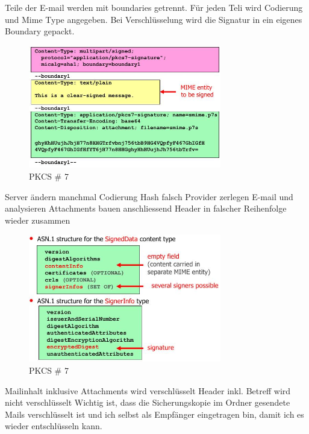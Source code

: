 \documentclass[ngerman,a4paper,12pt]{scrreprt}
\begin{document}


\ul
	\li Teile der E-mail werden mit boundaries getrennt.
	\li Für jeden Teli wird Codierung und Mime Type angegeben.
	\li Bei Verschlüsselung wird die Signatur in ein eigenes Boundary gepackt.
\ulE

\begin{figure}[H]
	\centering
	\includegraphics[width=0.75\textwidth]{img/V8.1.jpg}
	\caption{PKCS \# 7}
	\label{}
\end{figure}

\ul
	\li Server ändern manchmal Codierung \ra Hash falsch
	\li Provider zerlegen E-mail und analysieren Attachments \ra bauen anschliessend Header in falscher Reihenfolge wieder zusammen
\ulE

\begin{figure}[H]
	\centering
	\includegraphics[width=0.75\textwidth]{img/V8.2.jpg}
	\caption{PKCS \# 7}
	\label{}
\end{figure}

\ul
	\li Mailinhalt inklusive Attachments wird verschlüsselt
	\li Header inkl. Betreff wird nicht verschlüsselt
	\li Wichtig ist, dass die Sicherungskopie im Ordner gesendete Mails verschlüsselt ist und ich selbst als Empfänger eingetragen bin, damit ich es wieder entschlüsseln kann.
\ulE
\end{document}
